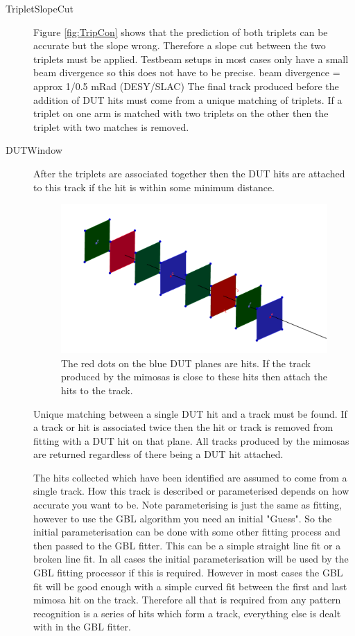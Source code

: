 \begin{description}
\item[TripletSlopeCut] Figure \ref{fig:TripCon} shows that the prediction of both triplets can be accurate but the slope wrong. Therefore a slope cut between the two triplets must be applied. Testbeam setups in most cases only have a small beam divergence so this does not have to be precise.
\newline
\newline 
beam divergence = approx 1/0.5 mRad (DESY/SLAC)
\newline
\newline
The final track produced before the addition of DUT hits must come from a unique matching of triplets. If a triplet on one arm is matched with two triplets on the other then the triplet with two matches is removed.

\item[DUTWindow] After the triplets are associated together then the DUT hits are attached to this track if the hit is within some minimum distance. 
\begin{figure}[H]
\centering
\includegraphics[width=1.0\linewidth]{figures/DUThitsPat.png}
\caption{The red dots on the blue DUT planes are hits. If the track produced by the mimosas is close to these hits then attach the hits to the track.}
\label{fig:DoubDis}
\end{figure}

Unique matching between a single DUT hit and a track must be found. If a track or hit is associated twice then the hit or track is removed from fitting with a DUT hit on that plane. All tracks produced by the mimosas are returned regardless of there being a DUT hit attached.

The hits collected which have been identified are assumed to come from a single track. How this track is described or parameterised depends on how accurate you want to be. Note parameterising is just the same as fitting, however to use the GBL algorithm you need an initial "Guess". So the initial parameterisation can be done with some other fitting process and then passed to the GBL fitter. This can be a simple straight line fit or a broken line fit.
In all cases the initial parameterisation will be used by the GBL fitting processor if this is required. However in most cases the GBL fit will be good enough with a simple curved fit between the first and last mimosa hit on the track. Therefore all that is required from any pattern recognition is a series of hits which form a track, everything else is dealt with in the GBL fitter.


\end{description}




